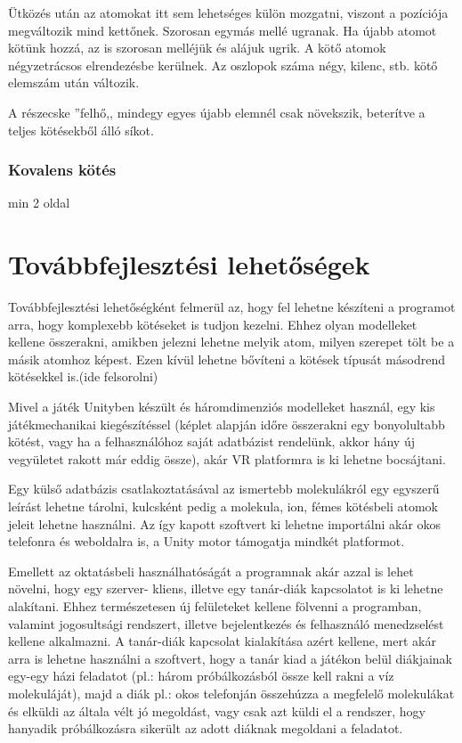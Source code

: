 \documentclass[colorlinks]{thesis-ekf}
\theoremstyle{definition}
\theoremstyle{remark}
\begin{document}
Ütközés után az atomokat itt sem lehetséges külön mozgatni, viszont a pozíciója megváltozik mind kettőnek. Szorosan egymás mellé ugranak. Ha újabb atomot kötünk hozzá, az is szorosan melléjük és alájuk ugrik. A kötő atomok négyzetrácsos elrendezésbe kerülnek. Az oszlopok száma négy, kilenc, stb. kötő elemszám után változik.

A részecske ''felhő,, mindegy egyes újabb elemnél csak növekszik, beterítve a teljes kötésekből álló síkot.
\subsection{Kovalens kötés}
min 2 oldal
\chapter{Továbbfejlesztési lehetőségek}
Továbbfejlesztési lehetőségként felmerül az, hogy fel lehetne készíteni a programot arra, hogy komplexebb kötéseket is tudjon kezelni. Ehhez olyan modelleket kellene összerakni, amikben jelezni lehetne melyik atom, milyen szerepet tölt be a másik atomhoz képest. Ezen kívül lehetne bővíteni a kötések típusát másodrend kötésekkel is.(ide felsorolni)

Mivel a játék Unityben készült és háromdimenziós modelleket használ, egy kis játékmechanikai kiegészítéssel (képlet alapján időre összerakni egy bonyolultabb kötést, vagy ha a felhasználóhoz saját adatbázist rendelünk, akkor hány új vegyületet rakott már eddig össze), akár VR platformra is ki lehetne bocsájtani.

Egy külső adatbázis csatlakoztatásával az ismertebb molekulákról egy egyszerű leírást lehetne tárolni, kulcsként pedig a molekula, ion, fémes kötésbeli atomok jeleit lehetne használni. Az így kapott szoftvert ki lehetne importálni akár okos telefonra és weboldalra is, a Unity motor támogatja mindkét platformot.

Emellett az oktatásbeli használhatóságát a programnak akár azzal is lehet növelni, hogy egy szerver- kliens, illetve egy tanár-diák kapcsolatot is ki lehetne alakítani. Ehhez természetesen új felületeket kellene fölvenni a programban, valamint jogosultsági rendszert, illetve bejelentkezés és felhasználó menedzselést kellene alkalmazni. A tanár-diák kapcsolat kialakítása azért kellene, mert akár arra is lehetne használni a szoftvert, hogy a tanár kiad a játékon belül diákjainak egy-egy házi feladatot (pl.: három próbálkozásból össze kell rakni a víz molekuláját), majd a diák pl.: okos telefonján összehúzza a megfelelő molekulákat és elküldi az általa vélt jó megoldást, vagy csak azt küldi el a rendszer, hogy hanyadik próbálkozásra sikerült az adott diáknak megoldani a feladatot. 
\end{document}
